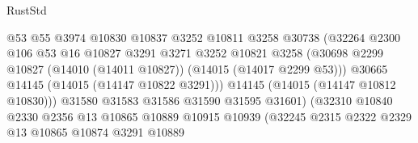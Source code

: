 \begin{lexlean}{RustStd}
\begin{coremodule}
                                        @53
                                        @55
                                        @3974
                                        @10830
                                        @10837
                                        @3252
                                        @10811
                                        @3258
                                        @30738
                                        (@32264
                                          @2300
                                          @106
                                          @53
                                          @16
                                          @10827
                                          @3291
                                          @3271
                                          @3252
                                          @10821
                                          @3258
                                          (@30698
                                            @2299
                                            @10827
                                            (@14010 (@14011 @10827))
                                            (@14015 (@14017 @2299 @53)))
                                          @30665
                                          @14145
                                          (@14015 (@14147 @10822 @3291)))
                                        @14145
                                        (@14015 (@14147 @10812 @10830)))
                                      @31580
                                      @31583
                                      @31586
                                      @31590
                                      @31595
                                      @31601)
                                    (@32310
                                      @10840
                                      @2330
                                      @2356
                                      @13
                                      @10865
                                      @10889
                                      @10915
                                      @10939
                                      (@32245
                                        @2315
                                        @2322
                                        @2329
                                        @13
                                        @10865
                                        @10874
                                        @3291
                                        @10889

\end{coremodule}
\end{lexlean}
